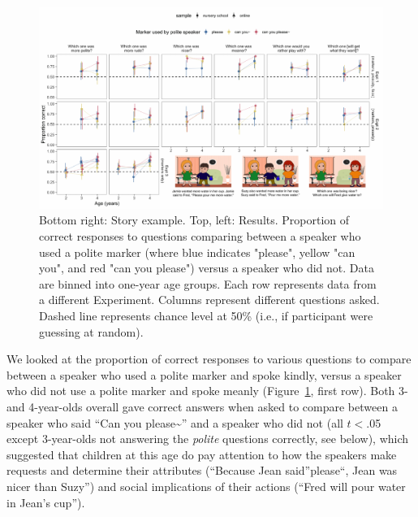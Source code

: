 \documentclass[10pt, letterpaper]{article}
\newenvironment{CodeChunk}{}{}
\begin{document}
\begin{CodeChunk}
\captionsetup{width=0.8\textwidth}\begin{figure}[h]

{\centering \includegraphics{figs/fig_results_placement-1} 

}

\caption[Bottom right]{Bottom right: Story example. Top, left: Results. Proportion of correct responses to questions comparing between a speaker who used a polite marker (where blue indicates "please", yellow "can you", and red "can you please") versus a speaker who did not. Data are binned into one-year age groups. Each row represents data from a different Experiment. Columns represent different questions asked. Dashed line represents chance level at 50\% (i.e., if participant were guessing at random).}\label{fig:fig_results_placement}
\end{figure}
\end{CodeChunk}

We looked at the proportion of correct responses to various questions to
compare between a speaker who used a polite marker and spoke kindly,
versus a speaker who did not use a polite marker and spoke meanly
(Figure~\ref{fig:fig_results_placement}, first row). Both 3- and
4-year-olds overall gave correct answers when asked to compare between a
speaker who said ``Can you please\textasciitilde{}'' and a speaker who
did not (all \(t<\).05 except 3-year-olds not answering the
\emph{polite} questions correctly, see below), which suggested that
children at this age do pay attention to how the speakers make requests
and determine their attributes (``Because Jean said''please``, Jean was
nicer than Suzy'') and social implications of their actions (``Fred will
pour water in Jean's cup'').
\end{document}
